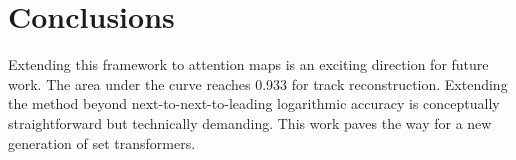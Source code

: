 \section{Conclusions}\label{sec:conclusions}

Extending this framework to attention maps is an exciting direction for
future work. The area under the curve reaches 0.933 for track
reconstruction. Extending the method beyond next-to-next-to-leading
logarithmic accuracy is conceptually straightforward but technically
demanding. This work paves the way for a new generation of set
transformers.

